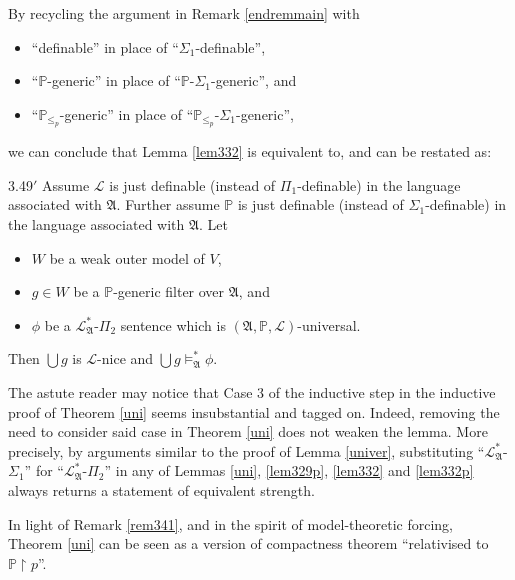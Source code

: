\documentclass[12pt]{article}
\numberwithin{equation}{section}
\begin{document}
By recycling the argument in Remark \ref{endremmain} with 
\begin{itemize}
    \item ``definable'' in place of ``$\Sigma_1$-definable'', 
    \item ``$\mathbb{P}$-generic'' in place of ``$\mathbb{P}$-$\Sigma_1$-generic'', and
    \item ``$\mathbb{P}_{\leq_p}$-generic'' in place of ``$\mathbb{P}_{\leq_p}$-$\Sigma_1$-generic'',
\end{itemize}
we can conclude that Lemma \ref{lem332} is equivalent to, and can be restated as:

\begin{customlem}{3.49$'$}\label{lem332p}
Assume $\mathcal{L}$ is just definable (instead of $\Pi_1$-definable) in the language associated with $\mathfrak{A}$. Further assume $\mathbb{P}$ is just definable (instead of $\Sigma_1$-definable) in the language associated with $\mathfrak{A}$. Let 
\begin{itemize} 
    \item $W$ be a weak outer model of $V$,
    \item $g \in W$ be a $\mathbb{P}$-generic filter over $\mathfrak{A}$, and
    \item $\phi$ be a $\mathcal{L}^{*}_{\mathfrak{A}}$-$\Pi_2$ sentence which is $(\mathfrak{A}, \mathbb{P}, \mathcal{L})$-universal.
\end{itemize} 
Then $\bigcup g$ is $\mathcal{L}$-nice and $\bigcup g \models^{*}_{\mathfrak{A}} \phi$.
\end{customlem}

\begin{rem}\label{rem333}
The astute reader may notice that Case 3 of the inductive step in the inductive proof of Theorem \ref{uni} seems insubstantial and tagged on. Indeed, removing the need to consider said case in Theorem \ref{uni} does not weaken the lemma. More precisely, by arguments similar to the proof of Lemma \ref{univer}, substituting ``$\mathcal{L}^{*}_{\mathfrak{A}}$-$\Sigma_1$'' for ``$\mathcal{L}^{*}_{\mathfrak{A}}$-$\Pi_2$'' in any of Lemmas \ref{uni}, \ref{lem329p}, \ref{lem332} and \ref{lem332p} always returns a statement of equivalent strength.
\end{rem}

\begin{rem}
In light of Remark \ref{rem341}, and in the spirit of model-theoretic forcing, Theorem \ref{uni} can be seen as a version of compactness theorem ``relativised to $\mathbb{P} \restriction p$''.
\end{rem}
\end{document}
